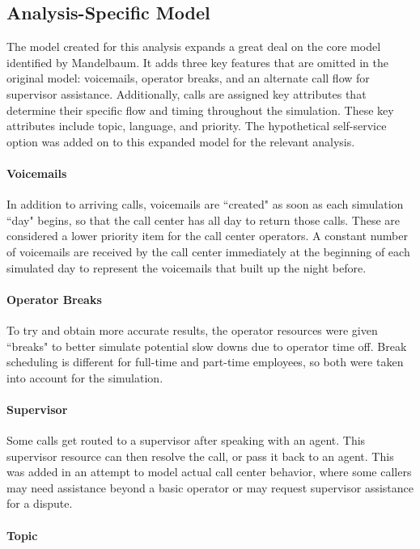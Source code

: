 \documentclass[12pt]{article}
\begin{document}
\subsection{Analysis-Specific Model}
The model created for this analysis expands a great deal on the core model identified by Mandelbaum.  It adds three key features that are omitted in the original model: voicemails, operator breaks, and an alternate call flow for supervisor assistance.  Additionally, calls are assigned key attributes that determine their specific flow and timing throughout the simulation.  These key attributes include topic, language, and priority.  The hypothetical self-service option was added on to this expanded model for the relevant analysis.

	\paragraph{Voicemails}
	
In addition to arriving calls, voicemails are ``created" as soon as each simulation ``day" begins, so that the call center has all day to return those calls.  These are considered a lower priority item for the call center operators.  A constant number of voicemails are received by the call center immediately at the beginning of each simulated day to represent the voicemails that built up the night before.

	\paragraph{Operator Breaks}
	
To try and obtain more accurate results, the operator resources were given ``breaks" to better simulate potential slow downs due to operator time off. Break scheduling is different for full-time and part-time employees, so both were taken into account for the simulation.

	\paragraph{Supervisor}
	
Some calls get routed to a supervisor after speaking with an agent.  This supervisor resource can then resolve the call, or pass it back to an agent.  This was added in an attempt to model actual call center behavior, where some callers may need assistance beyond a basic operator or may request supervisor assistance for a dispute. 

	\paragraph{Topic}
\end{document}
